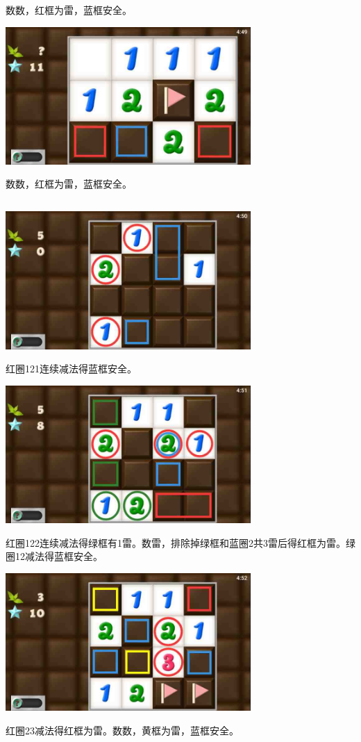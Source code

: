数数，红框为雷，蓝框安全。
\begin{center}
    \includegraphics[width=0.7\textwidth]{puzzlelow/72-5.jpg}
\end{center}
数数，红框为雷，蓝框安全。

\subsection{} %
\begin{center}
    \includegraphics[width=0.7\textwidth]{puzzlelow/73-1.jpg}
\end{center}
红圈121连续减法得蓝框安全。
\begin{center}
    \includegraphics[width=0.7\textwidth]{puzzlelow/73-2.jpg}
\end{center}
红圈122连续减法得绿框有1雷。数雷，排除掉绿框和蓝圈2共3雷后得红框为雷。绿圈12减法得蓝框安全。
\begin{center}
    \includegraphics[width=0.7\textwidth]{puzzlelow/73-3.jpg}
\end{center}
红圈23减法得红框为雷。数数，黄框为雷，蓝框安全。


